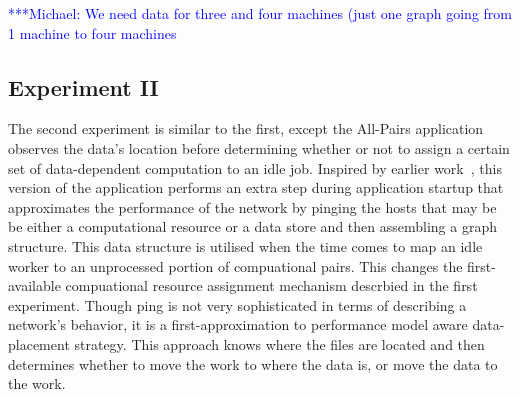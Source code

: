 \documentclass{rspublic}
\newcommand{\micnote}[1]{ {\textcolor{blue} { ***Michael: #1 }}} \else
\newcommand{\jhanote}[1]{} \newcommand{\micnote}[1]{} \newcommand{\fixme}[1]{}
\begin{document}
\jhanote{We need data for compute (comparision) and I/O (only) for
different data-set sizes} \micnote{We need data for three and four
machines (just one graph going from 1 machine to four machines}

\subsection{Experiment II} The second experiment is similar to the
first, except the All-Pairs application observes the data's location
before determining whether or not to assign a certain set of
data-dependent computation to an idle job.  Inspired by earlier
work~\citep{netperf}, this version of the application performs an extra
step during application startup that approximates the performance of the
network by pinging the hosts that may be be either a computational
resource or a data store and then  assembling a graph structure.  This
data structure is utilised when the time comes to map an idle worker to
an unprocessed portion of compuational pairs.  This changes the
first-available compuational resource assignment mechanism descrbied in
the first experiment.  Though ping is not very sophisticated in terms of
describing a network's behavior, it is a first-approximation to
performance model aware data-placement strategy.  This approach knows
where the files are located and then determines whether to move the work
to where the data is, or move the data to the work.  \jhanote{Data-aware
placement is also required, i.e., managing location of files.}  
\end{document}

